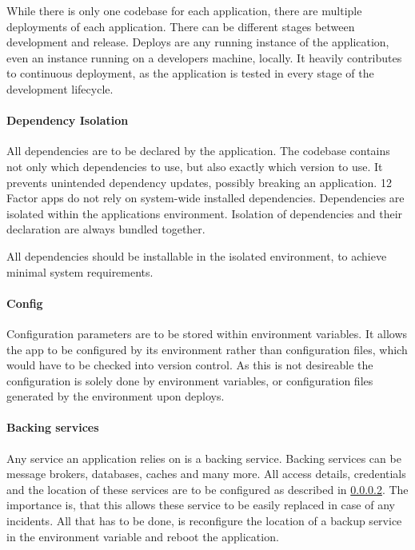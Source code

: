 While there is only one codebase for each application, there are multiple
deployments of each application. There can be different stages between
development and release. Deploys are any running instance of the application,
even an instance running on a developers machine, locally. It heavily
contributes to continuous deployment, as the application is tested in every
stage of the development lifecycle.

\paragraph{Dependency Isolation}

All dependencies are to be declared by the application. The codebase contains
not only which dependencies to use, but also exactly which version to use. It
prevents unintended dependency updates, possibly breaking an application. 12
Factor apps do not rely on system-wide installed dependencies. Dependencies are
isolated within the applications environment. Isolation of dependencies and
their declaration are always bundled together.

All dependencies should be installable in the isolated environment, to achieve
minimal system requirements.

\paragraph{Config}
\label{para:12factor:config}

Configuration parameters are to be stored within environment variables. It
allows the app to be configured by its environment rather than configuration
files, which would have to be checked into version control. As this is not
desireable the configuration is solely done by environment variables, or
configuration files generated by the environment upon deploys.

\paragraph{Backing services}

Any service an application relies on is a backing service. Backing services can
be message brokers, databases, caches and many more. All access details,
credentials and the location of these services are to be configured as
described in \ref{para:12factor:config}. The importance is, that this allows
these service to be easily replaced in case of any incidents. All that has to
be done, is reconfigure the location of a backup service in the environment
variable and reboot the application.

